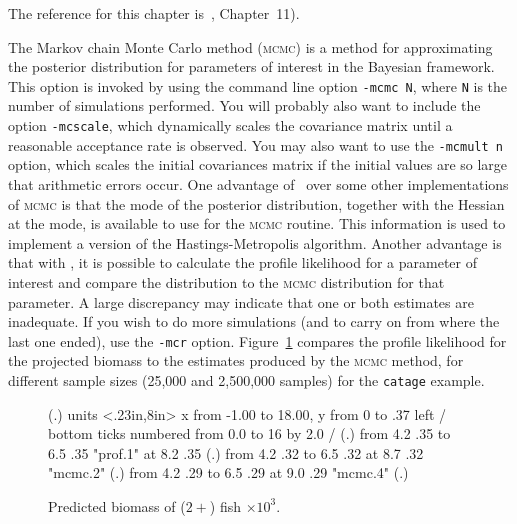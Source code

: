 \documentclass{admbmanual}
\begin{document}
The reference for this chapter is~\cite{gelmancarlinsternrubin}, Chapter~11).

The Markov chain Monte Carlo method (\textsc{mcmc}) is a method for
approximating the posterior distribution for parameters of interest in the
Bayesian framework. This option is invoked by using the command line option
\texttt{-mcmc N}, where \texttt{N} is the number of simulations performed. You
will probably also want to include the option \texttt{-mcscale}, which
dynamically scales the covariance matrix until a reasonable acceptance rate is
observed. You may also want to use the \texttt{-mcmult n} option, which scales
the initial covariances matrix if the initial values are so large that
arithmetic errors occur. One advantage of \ADM\ over some other implementations
of \textsc{mcmc} is that the mode of the posterior distribution, together with
the Hessian at the mode, is available to use for the \textsc{mcmc} routine. This
information is used to implement a version of the Hastings-Metropolis algorithm.
Another advantage is that with \ADM, it is possible to calculate the profile
likelihood for a parameter of interest and compare the distribution to the
\textsc{mcmc} distribution for that parameter. A large discrepancy may indicate
that one or both estimates are inadequate. If you wish to do more simulations
(and to carry on from where the last one ended), use the \texttt{-mcr} option.
Figure~\ref{fig:06} compares the profile likelihood for the projected biomass to
the estimates produced by the \textsc{mcmc} method, for different sample sizes
(25,000 and 2,500,000 samples) for the \texttt{catage} example.
\begin{figure}[htbp]
\centering\hskip1pt\beginpicture
  \setplotsymbol ({\eightrm .})
  \setcoordinatesystem units <.23in,8in>
  \setplotarea x from -1.00 to 18.00, y from 0 to .37
  \axis left
  /
  \axis bottom
  ticks numbered from 0.0 to 16 by 2.0
  /
  \setplotsymbol ({\eighteenrm .}) %
\setdashpattern <2pt,2pt,2pt,3pt>
 \putrule from 4.2 .35 to 6.5 .35
 \plot  "prof.1"
  at 8.2 .35
  \setplotsymbol ({\eightrm .})
\setdashpattern <1pt,3pt,4pt,3pt>
 \putrule from 4.2 .32 to 6.5 .32
  at 8.7 .32
 \plot  "mcmc.2"
\setdashpattern <1pt,1pt,1pt,1pt>
  \setplotsymbol ({\tenrm .})
 \putrule from 4.2 .29 to 6.5 .29
  at 9.0 .29
 \plot  "mcmc.4"
  \setplotsymbol ({\eighteenrm .}) %
\setdashpattern <1pt,3pt,4pt,3pt>
\endpicture
\caption{Predicted biomass of ($2+$) fish $\times 10^3$.}
\label{fig:06}
\end{figure}
\end{document}
